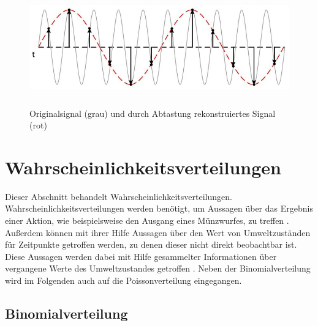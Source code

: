 \begin{figure}[!ht]
	\begin{center}
		\includegraphics[width=1.0\linewidth,height=50mm]{Abbildungen/grundlagen/abtasttheorem}
		\caption[Originalsignal und durch Abtastung rekonstruiertes Signal]{Originalsignal (grau) und durch Abtastung rekonstruiertes Signal (rot)\, \cite{BBG.2020}
		}
		\label{fig.Abtasttheorem}
	\end{center}
\end{figure}

\section{Wahrscheinlichkeitsverteilungen}
\label{sec.Wahrscheinlichkeitsverteilungen}
Dieser Abschnitt behandelt Wahrscheinlichkeitsverteilungen. Wahrscheinlichkeitsverteilungen werden benötigt, um Aussagen über das Ergebnis einer Aktion, wie beispielsweise den Ausgang eines Münzwurfes, zu treffen \cite{Teschl.2014}. Außerdem können mit ihrer Hilfe Aussagen über den Wert von Umweltzuständen für Zeitpunkte getroffen werden, zu denen dieser nicht direkt beobachtbar ist. Diese Aussagen werden dabei mit Hilfe gesammelter Informationen über vergangene Werte des Umweltzustandes getroffen \cite{Krajnik.2015}. Neben der Binomialverteilung wird im Folgenden auch auf die Poissonverteilung eingegangen. 
\subsection{Binomialverteilung}
\label{sec.Binomialverteilung}

